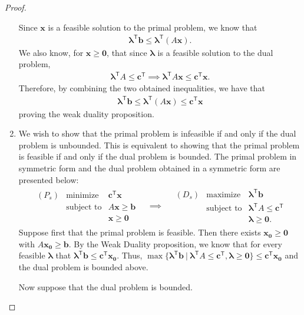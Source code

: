 \documentclass[12pt]{article}
\theoremstyle{definition}
\newcommand{\vc}[1]{\boldsymbol{#1}}
\newcommand{\tran}{\mathsf{T}}
\begin{document}
\begin{proof}
\begin{enumerate}
      Since $\vc{x}$ is a feasible solution to the primal problem, we know that
      \begin{align*}
        \vc{\lambda}^\tran \vc{b}\leq \vc{\lambda}^\tran (A\vc{x}).
      \end{align*}
      We also know, for $\vc{x} \geq \vc{0}$, that since $\vc{\lambda}$ is a feasible
      solution to the dual problem,
      \begin{align*}
        \vc{\lambda}^\tran A \leq \vc{c}^\tran \implies \vc{\lambda}^\tran A\vc{x} \leq \vc{c}^\tran\vc{x}.
      \end{align*}
      Therefore, by combining the two obtained inequalities, we have that
      \begin{align*}
        \vc{\lambda}^\tran \vc{b}\leq \vc{\lambda}^\tran (A\vc{x}) \leq \vc{c}^\tran\vc{x}
      \end{align*}
      proving the weak duality proposition.
    \item We wish to show that the primal problem is infeasible if and only if the dual problem is unbounded.
      This is equivalent to showing that the primal problem is feasible if and only if the dual problem is bounded.
      The primal problem in symmetric form and the dual problem obtained in a symmetric form are presented below:
      \begin{align*}
        \begin{array}{lrl}
          (P_s) & \text{minimize} & \vc{c}^\tran \vc{x} \\
          & \text{subject to} & A\vc{x} \geq \vc{b} \\
          & & \vc{x} \geq \vc{0}
        \end{array}
        \quad
        \implies
        \quad
        \begin{array}{lrl}
          (D_s) & \text{maximize} & \vc{\lambda}^\tran \vc{b} \\
          & \text{subject to} & \vc{\lambda}^\tran A \leq \vc{c}^\tran \\
          & & \vc{\lambda} \geq \vc{0}.
        \end{array}
      \end{align*}
      Suppose first that the primal problem is feasible. Then there exists $\vc{x_0} \geq \vc{0}$ with $A\vc{x_0} \geq \vc{b}$.
      By the Weak Duality proposition, we know that for every feasible
      $\vc{\lambda}$ that $\vc{\lambda}^\tran \vc{b} \leq \vc{c}^\tran\vc{x_0}$. Thus,
      $\max\{\vc{\lambda}^\tran \vc{b} \ |\ \vc{\lambda}^\tran A \leq \vc{c}^\tran, \vc{\lambda}\geq \vc{0} \} \leq \vc{c}^\tran\vc{x_0}$
      and the dual problem is bounded above.

      Now suppose that the dual problem is bounded.
  \end{enumerate}

\end{proof}
\newpage
\end{document}
